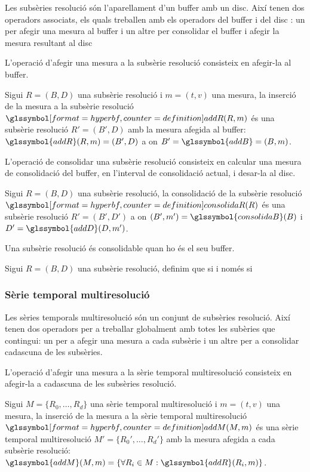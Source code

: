 Les subsèries resolució són l'aparellament d'un buffer amb un disc.
Així tenen dos operadors associats, els quals treballen amb els
operadors del buffer i del disc : un per afegir una mesura al buffer i
un altre per consolidar el buffer i afegir la mesura resultant al disc


L'operació d'afegir una mesura a la subsèrie resolució consisteix en
afegir-la al buffer.
\begin{definition}
  Sigui $R=(B,D)$ una subsèrie resolució i $m=(t,v)$ una mesura, la
  inserció de la mesura a la subsèrie resolució
  $\glssymboldef{addR}(R,m)$ és una subsèrie resolució $R'=(B',D)$
  amb la mesura afegida al buffer: $\glssymbol{addR}(R,m) = (B',D)$ a
  on $B'=\glssymbol{addB}=(B,m)$.
\end{definition}


L'operació de consolidar una subsèrie resolució consisteix en calcular
una mesura de consolidació del buffer, en l'interval de consolidació
actual, i desar-la al disc. 
\begin{definition}
  Sigui $R=(B,D)$ una subsèrie resolució, la consolidació de la
  subsèrie resolució $\glssymboldef{consolidaR}(R)$ és una subsèrie
  resolució $R'=(B',D')$ a on $(B',m') = \glssymbol{consolidaB}(B)$ i
  $D'=\glssymbol{addD}(D,m')$.
\end{definition}

Una subsèrie resolució és consolidable quan ho és el seu buffer.
\begin{definition}
  Sigui $R=(B,D)$ una subsèrie resolució, definim que
   si i només si 
\end{definition}



\subsubsection{Sèrie temporal multiresolució}

Les sèries temporals multiresolució són un conjunt de subsèries
resolució. Així tenen dos operadors per a treballar globalment amb
totes les subèries que contingui: un per a afegir una mesura a cada
subsèrie i un altre per a consolidar cadascuna de les subsèries.


L'operació d'afegir una mesura a la sèrie temporal multiresolució
consisteix en afegir-la a cadascuna de les subsèries resolució.
\begin{definition}
  Sigui $M=\{R_0,\dotsc,R_d\}$ una sèrie temporal multiresolució i
  $m=(t,v)$ una mesura, la inserció de la mesura a la sèrie temporal
  multiresolució $\glssymboldef{addM}(M,m)$ és una sèrie temporal
  multiresolució $M'=\{R_0',\dotsc,R_d'\}$ amb la mesura afegida a
  cada subsèrie resolució: $\glssymbol{addM}(M,m) = \{ \forall R_i\in
  M: \glssymbol{addR}(R_i,m) \}$.
\end{definition}


